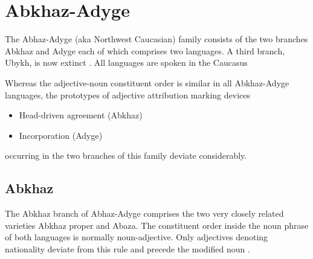 \section{Abkhaz-Adyge}
The Abhaz-Adyge (aka Northwest Caucasian) family consists of the two branches Abkhaz and Adyge each of which comprises two languages. A third branch, Ubykh, is now extinct \citep[220, 233]{salminen2007}. All languages are spoken in the Caucasus

Whereas the adjective-noun constituent order is similar in all Abkhaz-Adyge languages, the prototypes of adjective attribution marking devices
\begin{itemize}
\item Head-driven agreement (Abkhaz)
\item Incorporation (Adyge)
\end{itemize}
occurring in the two branches of this family deviate considerably.

\subsection{Abkhaz}
The Abkhaz branch of Abhaz-Adyge comprises the two very closely related varieties Abkhaz proper and Abaza. The constituent order inside the noun phrase of both languages is normally noun-adjective. Only adjectives denoting nationality deviate from this rule and precede the modified noun \citep[222]{comrie1981}.

